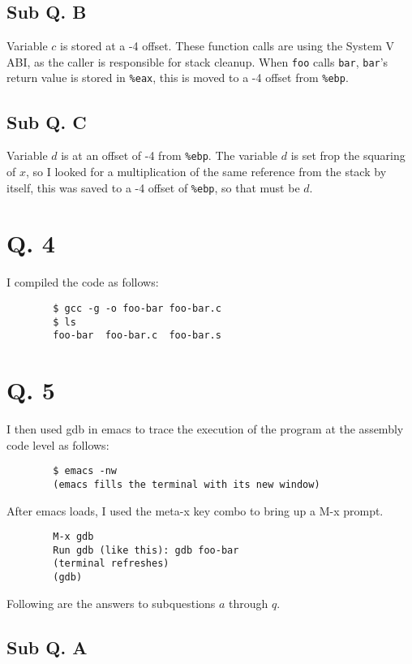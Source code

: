 \documentclass[letterpaper, 10pt]{article}
\begin{document}
	\subsection*{Sub Q. B}

		Variable $c$ is stored at a -4 offset. These function calls are using the System V ABI, as the caller is responsible for stack cleanup. When {\tt foo} calls {\tt bar}, {\tt bar}'s return value is stored in {\tt \%eax}, this is moved to a -4 offset from {\tt \%ebp}.

	\subsection*{Sub Q. C}

	Variable $d$ is at an offset of -4 from {\tt \%ebp}. The variable $d$ is set frop the squaring of $x$, so I looked for a multiplication of the same reference from the stack by itself, this was saved to a -4 offset of {\tt \%ebp}, so that must be $d$.

	\section*{Q. 4}

	I compiled the code as follows:

	\begin{verbatim}
		$ gcc -g -o foo-bar foo-bar.c
		$ ls
		foo-bar  foo-bar.c  foo-bar.s
	\end{verbatim}

	\section*{Q. 5}

	I then used gdb in emacs to trace the execution of the program at the assembly code level as follows:

	\begin{verbatim}
		$ emacs -nw
		(emacs fills the terminal with its new window)
	\end{verbatim}

	After emacs loads, I used the meta-x key combo to bring up a M-x prompt.

	\begin{verbatim}
		M-x gdb
		Run gdb (like this): gdb foo-bar
		(terminal refreshes)
		(gdb)
	\end{verbatim}

	Following are the answers to subquestions $a$ through $q$.

	\subsection*{Sub Q. A}
\end{document}
